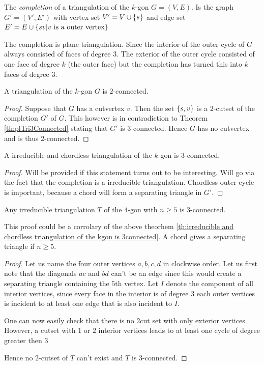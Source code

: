 The \emph{completion} of a triangulation of the $k$-gon $G = (V, E)$. Is the graph $G'= (V', E')$ with vertex set $V' = V \cup \left\lbrace {s} \right\rbrace$ and edge set $E' = E \cup \left\lbrace { sv | v \text{ is a outer vertex}} \right\rbrace$

The completion is plane triangulation.  %
Since the interior of the outer cycle of $G$ always consisted of faces of degree 3. The exterior of the outer cycle consisted of one face of degree $k$ (the outer face) but the completion has turned this into $k$ faces of degree $3$.

\begin{thrm}
A triangulation of the $k$-gon $G$ is $2$-connected.
\end{thrm}
\begin{proof}
Suppose that $G$ has a cutvertex $v$. Then the set $\left\lbrace {s, v} \right\rbrace$ is a $2$-cutset of the completion $G'$ of $G$. This however is in contradiction to Theorem \ref{th:plTri3Connected} stating that $G'$ is $3$-connected. Hence $G$ has no cutvertex and is thus $2$-connected.
\end{proof}

\begin{thrm}
\label{th:irreducible and chordless triangulation of the kgon is 3connected}
A irreducible and chordless triangulation of the $k$-gon is $3$-connected.
\end{thrm}
\begin{proof}
\note Will be provided if this statement turns out to be interesting. Will go via the fact that the completion is a irreducible triangulation. Chordless outer cycle is important, because a chord will form a separating triangle in $G'$.
\end{proof}

\begin{thrm}
Any irreducible triangulation $T$ of the $4$-gon with $n \geq 5$ is $3$-connected.
\end{thrm}

\note This proof could be a corrolary of the above theorhem \ref{th:irreducible and chordless triangulation of the kgon is 3connected}. A chord gives a separating triangle if $n\geq 5$.
\begin{proof}
Let us name the four outer vertices $a,b,c,d$ in clockwise order. Let us first note that the diagonals $ac$ and $bd$ can't be an edge since this would create a separating triangle containing the $5$th vertex. Let $I$ denote the component of all interior vertices, since every face in the interior is of degree $3$ each outer vertices is incident to at least one edge that is also incident to $I$. %

One can now easily check that there is no $2$cut set with only exterior vertices. However, a cutset with $1$ or $2$ interior vertices leads to at least one cycle of degree greater then $3$ %

Hence no $2$-cutset of $T$ can't exist and $T$ is $3$-connected.
\end{proof}

